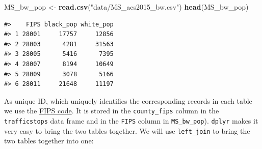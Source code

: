 \documentclass[]{book}
\newenvironment{Shaded}{\begin{snugshade}}{\end{snugshade}}
\newcommand{\KeywordTok}[1]{\textcolor[rgb]{0.13,0.29,0.53}{\textbf{#1}}}
\newcommand{\DataTypeTok}[1]{\textcolor[rgb]{0.13,0.29,0.53}{#1}}
\newcommand{\StringTok}[1]{\textcolor[rgb]{0.31,0.60,0.02}{#1}}
\newcommand{\OperatorTok}[1]{\textcolor[rgb]{0.81,0.36,0.00}{\textbf{#1}}}
\newcommand{\NormalTok}[1]{#1}
\theoremstyle{definition}
\theoremstyle{definition}
\theoremstyle{definition}
\theoremstyle{remark}
\begin{document}
\begin{Shaded}
\begin{Highlighting}[]
\NormalTok{MS_bw_pop <-}\StringTok{ }\KeywordTok{read.csv}\NormalTok{(}\StringTok{"data/MS_acs2015_bw.csv"}\NormalTok{)}
\KeywordTok{head}\NormalTok{(MS_bw_pop)}
\end{Highlighting}
\end{Shaded}

\begin{verbatim}
#>    FIPS black_pop white_pop
#> 1 28001     17757     12856
#> 2 28003      4281     31563
#> 3 28005      5416      7395
#> 4 28007      8194     10649
#> 5 28009      3078      5166
#> 6 28011     21648     11197
\end{verbatim}

As unique ID, which uniquely identifies the corresponding records in
each table we use the
\href{https://en.wikipedia.org/wiki/Federal_Information_Processing_Standards}{FIPS
code}. It is stored in the \texttt{county\_fips} column in the
\texttt{trafficstops} data frame and in the \texttt{FIPS} column in
\texttt{MS\_bw\_pop}). \texttt{dplyr} makes it very easy to bring the
two tables together. We will use \texttt{left\_join} to bring the two
tables together into one:

\begin{Shaded}
\end{Shaded}
\end{document}

